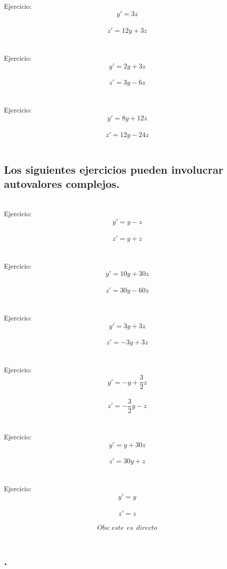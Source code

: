 \documentclass{article}
\begin{document}
\ \\ Ejercicio:  $$y'=3z$$\\
      $$z'=12y+3z$$\\


\ \\ Ejercicio:  $$ y'=2y+3z $$\\
      $$ z'= 3y-6z $$\\



\ \\ Ejercicio:  $$ y'=8y+12z $$\\
      $$ z'= 12y-24z $$\\




\subsection{Los siguientes ejercicios pueden involucrar autovalores complejos.}


\ \\ Ejercicio:  $$ y'=y-z $$\\
      $$ z'= y+z $$\\



\ \\ Ejercicio:  $$ y'=10y+30z $$\\
      $$ z'= 30y-60z $$\\



\ \\ Ejercicio:  $$ y'= 3y+3z$$\\
      $$ z'= -3y+3z$$\\%

\ \\ Ejercicio:  $$ y'=-y+\frac{3}{2}z $$\\
      $$ z'= -\frac{3}{2}y-z $$\\

\ \\ Ejercicio:  $$ y'=y+30z $$\\
      $$ z'= 30y+z $$\\

\ \\ Ejercicio:  $$ y'=y $$\\
      $$ z'= z $$\\
$$ Obs: este\ \ es\ \ directo$$\\


\subsection*{{.}}
\end{document}
